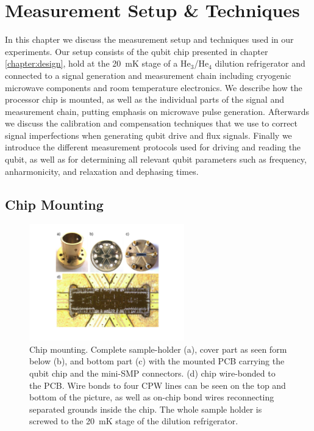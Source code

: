 \chapter{Measurement Setup \& Techniques} \label{chapter:measurement}

In this chapter we discuss the measurement setup and techniques used in our experiments. Our setup consists of the qubit chip presented in chapter \ref{chapter:design}, hold at the 20~mK stage of a He$_3$/He$_4$ dilution refrigerator and connected to a signal generation and measurement chain including cryogenic microwave components and room temperature electronics. We describe how the processor chip is mounted, as well as the individual parts of the signal  and measurement chain, putting emphasis on microwave pulse generation. Afterwards we discuss the calibration and compensation techniques that we use to correct signal imperfections when generating qubit drive and flux signals. Finally we introduce the different measurement protocols used for driving and reading the qubit, as well as for determining all relevant qubit parameters such as frequency, anharmonicity, and relaxation and dephasing times.

\smallskip

\section{Chip Mounting}

\begin{figure}
	\centering
		\includegraphics[width=0.6\textwidth]{"./material/photos/sample holder/sample_holder"}
	\caption[]{Chip mounting. Complete sample-holder (a), cover part as seen form below (b), and bottom part (c) with the mounted PCB carrying the qubit chip and the mini-SMP connectors. (d)  chip  wire-bonded to the PCB. Wire bonds to four CPW lines can be seen on the top and bottom of the picture, as well as on-chip bond wires reconnecting separated grounds inside the chip. The whole sample holder is screwed to the 20~mK stage of the dilution refrigerator.}
	\label{fig:pcb_and_sample_holder}
\end{figure}

